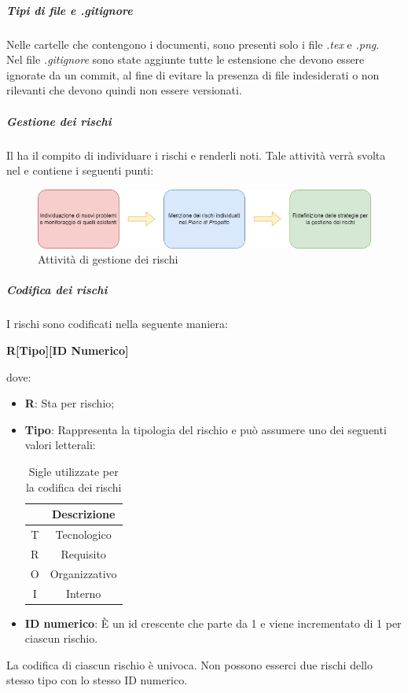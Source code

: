 \subparagraph*{Tipi di file e \textit{.gitignore}}
Nelle cartelle che contengono i documenti, sono presenti solo i file \textit{.tex} e \textit{.png}.\\
Nel file \textit{.gitignore} sono state aggiunte tutte le estensione che devono essere ignorate da un commit, al fine di evitare la presenza di file indesiderati
o non rilevanti che devono quindi non essere versionati.
\subparagraph*{Gestione dei rischi}
Il \roleProjectManagerLow{} ha il compito di individuare i rischi e renderli noti. Tale attività verrà svolta nel \docNamePdPLow{} e contiene i seguenti punti:
\begin{figure}[htbp]
\centering
\includegraphics[scale =0.65]{../template/images/NdP/GestioneRischi.png}
\caption{Attività di gestione dei rischi}
\end {figure}

\subparagraph* {Codifica dei rischi}
I rischi sono codificati nella seguente maniera: \\
\begin{center}
  \textbf{\Large{R[Tipo][ID Numerico]}}
\end{center}
dove:
\begin{itemize}[label={}]
  \item \textbf{R}: Sta per rischio;
  \item \textbf{Tipo}: Rappresenta la tipologia del rischio e può assumere uno dei seguenti valori letterali:
        \begin{table}[H]
          \centering
          \renewcommand{\arraystretch}{1.8}
          \begin{tabular}{c|c}
            \rowcolor[HTML]{125E28}
            \multicolumn{1}{c}{\color[HTML]{FFFFFF}\textbf{Sigla}}
              & \multicolumn{1}{c}{\color[HTML]{FFFFFF}\textbf{Descrizione}} \\
            \hline
            T & Tecnologico                                                  \\
            R & Requisito                                                    \\
            O & Organizzativo                                                \\
            I & Interno                                                      \\
          \end{tabular}
          \caption{Sigle utilizzate per la codifica dei rischi}
        \end{table}
  \item \textbf{ID numerico}: È un id crescente che parte da 1 e viene incrementato di 1 per ciascun rischio.\\
\end{itemize}
La codifica di ciascun rischio è univoca. Non possono esserci due rischi dello stesso tipo con lo stesso ID numerico.


